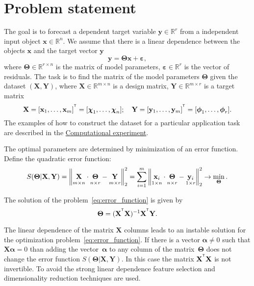 \documentclass[12pt,twoside]{article}
\newcommand{\bx}{\mathbf{x}}
\newcommand{\by}{\mathbf{y}}
\newcommand{\bY}{\mathbf{Y}}
\newcommand{\bX}{\mathbf{X}}
\newcommand{\bbR}{\mathbb{R}}
\newcommand{\bchi}{\boldsymbol{\chi}}
\newcommand{\bphi}{\boldsymbol{\phi}}
\newcommand{\bTheta}{\boldsymbol{\Theta}}
\newcommand{\T}{^{\text{\tiny\sffamily\upshape\mdseries T}}}
\begin{document}
\linenumbers
\section{Problem statement}

The goal is to forecast a dependent target variable $\by \in \bbR^r$ from a independent input object $\bx \in \bbR^n$.
We assume that there is a linear dependence between the objects $\bx$ and the target vector $\by$
\begin{equation}
	 \by = \bTheta \bx+ \boldsymbol{\varepsilon}, 
	\label{eq:model}
\end{equation}
where $\bTheta \in \bbR^{r \times n}$ is the matrix of model parameters, $\boldsymbol{\varepsilon} \in \bbR^{r}$ is the vector of residuals.
The task is to find the matrix of the model parameters $\bTheta$ given the dataset $\left( \bX, \bY \right)$, where $\bX \in \bbR^{m \times n}$ is a design matrix, $\bY \in \bbR^{m \times r}$ is a target matrix
\[
	\bX = [\bx_1, \dots, \bx_m]^{\T} =  [\bchi_1, \dots, \bchi_n]; \quad \bY = [\by_1, \dots, \by_m]^{\T} =  [\bphi_1, \dots, \bphi_r].
\]
The examples of how to construct the dataset for a particular application task are described in the \hyperref[sec:exper]{Computational experiment}.

The optimal parameters are determined by minimization of an error function. 
Define the quadratic error function:
\begin{equation}
	S(\bTheta | \bX, \bY) = {\left\| \underset{m \times n}{\vphantom{\by}\bX} \cdot \underset{n \times r}{\vphantom{\by}\bTheta} - \underset{m \times r}{\vphantom{\by}\mathbf{Y}} \right\| }_2^2 = \sum_{i=1}^m \left\| \underset{1 \times n}{\vphantom{\by}\bx_i} \cdot \underset{n \times r}{\vphantom{\by}\bTheta} - \underset{1 \times r}{\vphantom{\by}\by_i} \right\|_2^2 \rightarrow\min_{\bTheta}.
\label{eq:error_function}
\end{equation}
 
 The solution of the problem~\eqref{eq:error_function} is given by
 \[
 	\bTheta = (\bX^{\T} \bX)^{-1} \bX^{\T} \bY.
 \]
 
 The linear dependence of the matrix $\bX$ columns leads to an instable solution for the optimization problem~\eqref{eq:error_function}. 
 If there is a vector $\boldsymbol{\alpha} \neq 0$ such that $\bX \boldsymbol{\alpha}= 0$ than adding the vector~$\boldsymbol{\alpha}$ to any column of the matrix~$\bTheta$ does not change the error function $S(\bTheta | \bX, \bY)$.
 In this case the matrix $\bX^{\T} \bX$ is not invertible.
 To avoid the strong linear dependence feature selection and dimensionality reduction techniques are used.
 
\end{document}
